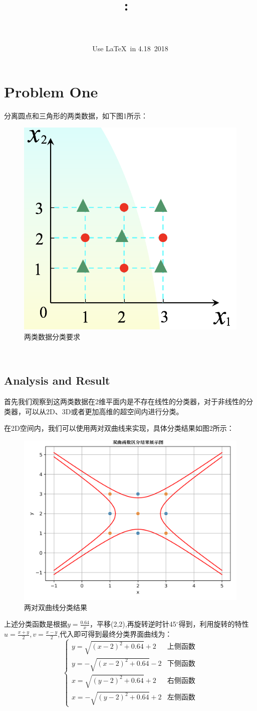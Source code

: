 \documentclass{article}
\title{
    \vspace{2in}
    \textmd{\textbf{\hmwkClass:\ \hmwkTitle}}\\
    \vspace{0.5cm}\LARGE{\textit{\hmwkClassInstructor}}
    \vspace{4in}
}
\author{\hmwkAuthorName\\
{\schoolID}\\
Use \LaTeX ~in 4.18~2018}
\date{}
\newcommand{\hs}{\hspace{2em}}
\begin{document}
\maketitle
\setcounter{page}{0}
\thispagestyle{empty}
\pagebreak

\section{Problem One}
{}

\hs 分离圆点和三角形的两类数据，如下图1所示：
\begin{figure}[htbp]
	\centering
	\includegraphics[width=0.35\linewidth]{img//fig0.png}
	\caption{两类数据分类要求}
\end{figure}\\[-0.5cm]
\subsection*{Analysis and Result}

\hs 首先我们观察到这两类数据在2维平面内是不存在线性的分类器，对于非线性的分类器，可以从2D、3D或者更加高维的超空间内进行分类。\\


{}

\hs 在2D空间内，我们可以使用两对双曲线来实现，具体分类结果如图2所示：
\begin{figure}[htbp]
	\centering
	\includegraphics[width=0.45\linewidth]{img//fig2.png}
	\caption{两对双曲线分类结果}
\end{figure}

上述分类函数是根据$y=\frac{0.64}{x}$，平移(2,2),再旋转逆时针45$^\circ$得到，利用旋转的特性$u=\frac{x+y}{2},v=\frac{x-y}{2}$,代入即可得到最终分类界面曲线为：
\begin{equation*}
\left\lbrace \begin{array}{cc}
y = \sqrt{(x-2)^2+0.64}+2 & \text{上侧函数} \\
y = -\sqrt{(x-2)^2+0.64}-2 & \text{下侧函数}\\
x = \sqrt{(y-2)^2+0.64}+2 & \text{右侧函数} \\
x = -\sqrt{(y-2)^2+0.64}+2 & \text{左侧函数}
\end{array}\right. 
\end{equation*}\\
\end{document}
